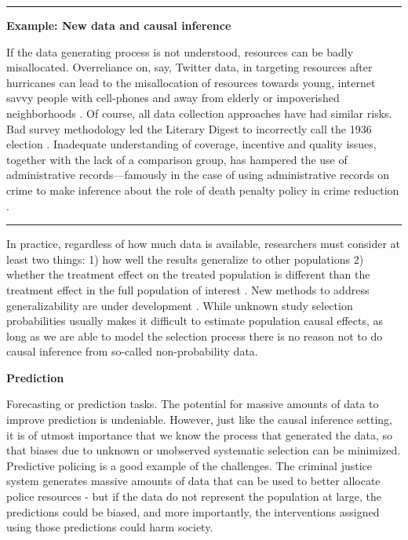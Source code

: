 \documentclass[]{krantz}
\begin{document}
\begin{center}\rule{0.5\linewidth}{\linethickness}\end{center}

\textbf{Example: New data and causal inference}

If the data generating process is not understood, resources can be badly
misallocated. Overreliance on, say, Twitter data, in targeting resources
after hurricanes can lead to the misallocation of resources towards
young, internet savvy people with cell-phones and away from elderly or
impoverished neighborhoods \citep{shelton2014mapping}. Of course, all
data collection approaches have had similar risks. Bad survey
methodology led the Literary Digest to incorrectly call the 1936
election \citep{squire19881936}. Inadequate understanding of coverage,
incentive and quality issues, together with the lack of a comparison
group, has hampered the use of administrative records---famously in the
case of using administrative records on crime to make inference about
the role of death penalty policy in crime reduction
\citep{donohue2006uses}.

\begin{center}\rule{0.5\linewidth}{\linethickness}\end{center}

In practice, regardless of how much data is available, researchers must
consider at least two things: 1) how well the results generalize to
other populations \citep{athey2017state} 2) whether the treatment effect
on the treated population is different than the treatment effect in the
full population of interest \citep{stuart2010matching}. New methods to
address generalizability are under development
\citep{dugoff2014generalizing}. While unknown study selection
probabilities usually makes it difficult to estimate population causal
effects, as long as we are able to model the selection process there is
no reason not to do causal inference from so-called non-probability
data.

\textbf{Prediction}

Forecasting or prediction tasks. The potential for massive amounts of
data to improve prediction is undeniable. However, just like the causal
inference setting, it is of utmost importance that we know the process
that generated the data, so that biases due to unknown or unobserved
systematic selection can be minimized. Predictive policing is a good
example of the challenges. The criminal justice system generates massive
amounts of data that can be used to better allocate police resources -
but if the data do not represent the population at large, the
predictions could be biased, and more importantly, the interventions
assigned using those predictions could harm society.
\end{document}
